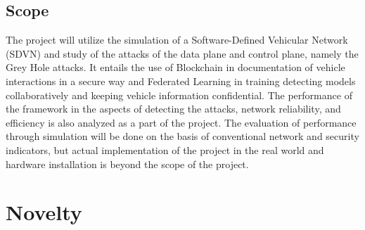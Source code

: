 \documentclass[12pt, a4paper]{report}
\newcommand{\mypar}{\vspace{0.8em}\noindent}
\begin{document}
\subsection{Scope}

The project will utilize the simulation of a Software-Defined Vehicular Network (SDVN) and study of the attacks of the data plane and control plane, namely the Grey Hole attacks. It entails the use of Blockchain in documentation of vehicle interactions in a secure way and Federated Learning in training detecting models collaboratively and keeping vehicle information confidential. The performance of the framework in the aspects of detecting the attacks, network reliability, and efficiency is also analyzed as a part of the project. The evaluation of performance through simulation will be done on the basis of conventional network and security indicators, but actual implementation of the project in the real world and hardware installation is beyond the scope of the project.



\mypar
\section{Novelty}

\end{document}
